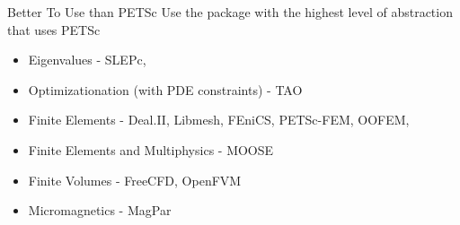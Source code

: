 

\begin{frame}{Better To Use than PETSc}
 Use the package with the highest level of abstraction that uses PETSc

    \begin{itemize}
    \item Eigenvalues - SLEPc,
    \item Optimizationation (with PDE constraints) - TAO
    \item Finite Elements -  Deal.II, Libmesh, FEniCS, PETSc-FEM,  OOFEM, 
    \item Finite Elements and Multiphysics - MOOSE 
    \item Finite Volumes -  FreeCFD, OpenFVM
    \item Micromagnetics - MagPar
    \end{itemize}
\end{frame}
